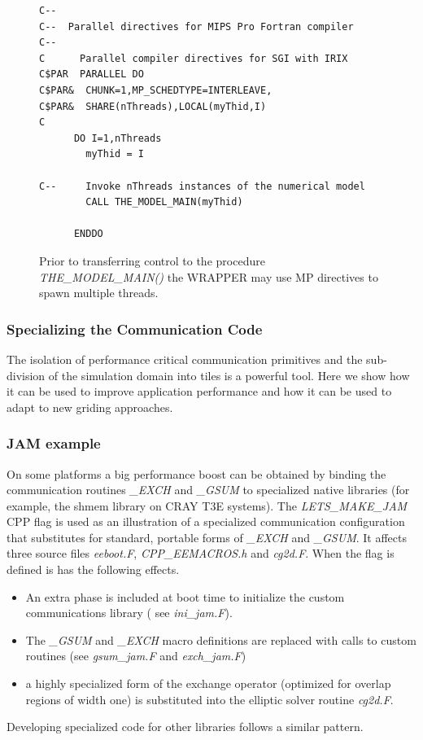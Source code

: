 \begin{figure}
\begin{verbatim}
C--
C--  Parallel directives for MIPS Pro Fortran compiler
C--
C      Parallel compiler directives for SGI with IRIX
C$PAR  PARALLEL DO
C$PAR&  CHUNK=1,MP_SCHEDTYPE=INTERLEAVE,
C$PAR&  SHARE(nThreads),LOCAL(myThid,I)
C
      DO I=1,nThreads
        myThid = I

C--     Invoke nThreads instances of the numerical model
        CALL THE_MODEL_MAIN(myThid)

      ENDDO
\end{verbatim}
  \caption{Prior to transferring control to the procedure {\em
      THE\_MODEL\_MAIN()} the WRAPPER may use MP directives to spawn
    multiple threads.  } \label{fig:mp_directives}
\end{figure}


\subsubsection{Specializing the Communication Code}

The isolation of performance critical communication primitives and the
sub-division of the simulation domain into tiles is a powerful tool.
Here we show how it can be used to improve application performance and
how it can be used to adapt to new griding approaches.

\subsubsection{JAM example}
\label{sec:jam_example}
On some platforms a big performance boost can be obtained by binding
the communication routines {\em \_EXCH} and {\em \_GSUM} to
specialized native libraries (for example, the shmem library on CRAY
T3E systems). The {\em LETS\_MAKE\_JAM} CPP flag is used as an
illustration of a specialized communication configuration that
substitutes for standard, portable forms of {\em \_EXCH} and {\em
  \_GSUM}. It affects three source files {\em eeboot.F}, {\em
  CPP\_EEMACROS.h} and {\em cg2d.F}. When the flag is defined is has
the following effects.
\begin{itemize}
\item An extra phase is included at boot time to initialize the custom
  communications library ( see {\em ini\_jam.F}).
\item The {\em \_GSUM} and {\em \_EXCH} macro definitions are replaced
  with calls to custom routines (see {\em gsum\_jam.F} and {\em
    exch\_jam.F})
\item a highly specialized form of the exchange operator (optimized
  for overlap regions of width one) is substituted into the elliptic
  solver routine {\em cg2d.F}.
\end{itemize}
Developing specialized code for other libraries follows a similar
pattern.

